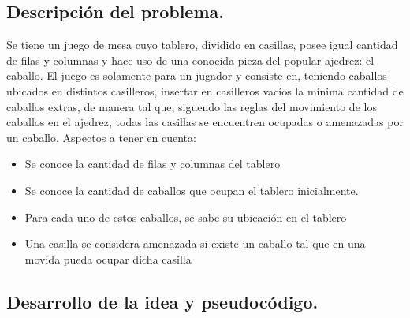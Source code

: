 \subsection{Descripción del problema.}

\vspace*{0.3cm}

Se tiene un juego de mesa cuyo tablero, dividido en casillas, posee igual cantidad de filas y columnas y hace uso de una conocida pieza del popular ajedrez: el caballo. El juego es solamente para un jugador y consiste en, teniendo caballos ubicados en distintos casilleros, insertar en casilleros vacíos la mínima cantidad de caballos extras, de manera tal que, siguendo las reglas del movimiento de los caballos en el ajedrez, todas las casillas se encuentren ocupadas o amenazadas por un caballo.
Aspectos a tener en cuenta:

\begin{itemize}
   \item Se conoce la cantidad de filas y columnas del tablero
   \item Se conoce la cantidad de caballos que ocupan el tablero inicialmente.
   \item Para cada uno de estos caballos, se sabe su ubicación en el tablero
   \item Una casilla se considera amenazada si existe un caballo tal que en una movida pueda ocupar dicha casilla
\end{itemize}


\vspace*{0.6cm}

\subsection{Desarrollo de la idea y pseudocódigo.}



